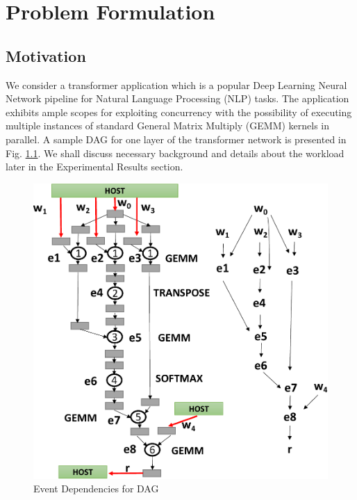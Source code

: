 
\chapter{Problem Formulation} %

\label{Chapter3} %


\section{Motivation}
We consider a transformer application \cite{DBLP:journals/corr/VaswaniSPUJGKP17} which is a popular Deep Learning Neural Network pipeline for Natural Language Processing (NLP) tasks. The application exhibits ample scopes for exploiting concurrency with the possibility of executing multiple instances of standard General Matrix Multiply (GEMM) kernels in parallel. A sample DAG for one layer of the transformer network is presented in Fig. \ref{fig:motivation0}. We shall discuss necessary background and details about the workload later in the Experimental Results section.  
	\begin{figure}[ht]  
		\centering
		\includegraphics[scale=0.50]{Pictures/Transformer_modified.pdf}
		\caption{Event Dependencies for  DAG\label{fig:motivation0}}
	\end{figure}
